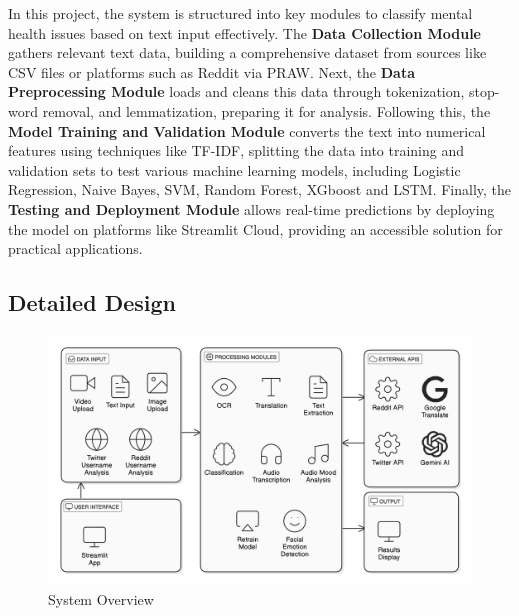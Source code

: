 \noindent
In this project, the system is structured into key modules to classify mental health issues based on text input effectively. The \textbf{Data Collection Module} gathers relevant text data, building a comprehensive dataset from sources like CSV files or platforms such as Reddit via PRAW. Next, the \textbf{Data Preprocessing Module} loads and cleans this data through tokenization, stop-word removal, and lemmatization, preparing it for analysis. Following this, the \textbf{Model Training and Validation Module} converts the text into numerical features using techniques like TF-IDF, splitting the data into training and validation sets to test various machine learning models, including Logistic Regression, Naive Bayes, SVM, Random Forest, XGboost and LSTM. Finally, the \textbf{Testing and Deployment Module} allows real-time predictions by deploying the model on platforms like Streamlit Cloud, providing an accessible solution for practical applications.

\subsection{Detailed Design}
\begin{figure}[h!]  
    \centering
    \includegraphics[width=1.0\textwidth]{Images/System Overview.png}  
    \caption{System Overview}
    \label{System Overview}  %
\end{figure}

